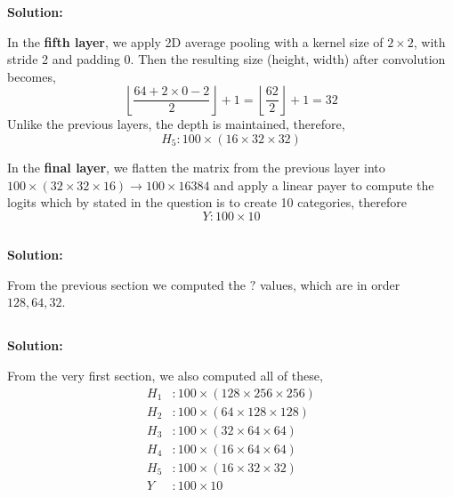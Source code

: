 \documentclass{article}
\newenvironment{solution}
  {\par\noindent\textbf{Solution:}\par}
  {\par}
\begin{document}
\begin{solution}
  In the \textbf{fifth layer}, we apply 2D average pooling with a kernel size of $2 \times 2$, with stride 2 and padding 0. Then the resulting size (height, width) after convolution 
  becomes, 
  \[ \left\lfloor  \frac{64 + 2 \times 0 -2 }{2}  \right\rfloor +1 = \left\lfloor  \frac{62}{2}  \right\rfloor +1=32 \]
  Unlike the previous layers, the depth is maintained, therefore, 
  \[ H_5: 100 \times (16 \times 32 \times 32) \]

  In the \textbf{final layer}, we flatten the matrix from the previous layer into $100 \times (32 \times 32 \times 16) \to  100 \times 16384$ and apply a linear payer to compute the logits which by stated in the question 
  is to create 10 categories, therefore 
  \[ Y: 100 \times 10 \]
\end{solution}

\subsection{}
\begin{solution}
  From the previous section we computed the $?$ values, which are in order $128, 64, 32$.
\end{solution}

\subsection{} 
\begin{solution}
  From the very first section, we also computed all of these, 
  \[
    \begin{aligned}
      H_1 &: 100 \times(128 \times 256 \times 256)  \\ 
      H_2 &: 100 \times (64 \times 128 \times 128) \\ 
      H_3 &: 100 \times (32 \times 64 \times 64) \\ 
      H_4 &: 100 \times (16 \times 64 \times 64) \\ 
      H_5 &: 100 \times (16 \times 32 \times 32) \\ 
      Y  &: 100 \times 10
    \end{aligned}
  \]
\end{solution}
\end{document}
